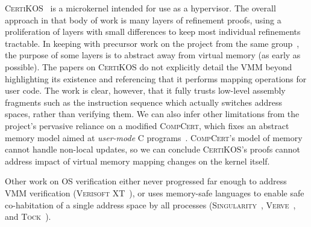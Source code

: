 \textsc{CertiKOS}~\cite{gu15,gu2016certikos,gu2018certikos,chen2016interrupts} is a microkernel intended for use as a hypervisor.
The overall approach in that body of work is many layers of refinement proofs, using a
 proliferation of layers with small differences to keep most individual refinements tractable. In keeping with precursor work 
on the project from the same group~\cite{vaynberg2012compositional}, the purpose of some layers is to abstract away from 
virtual memory (as early as possible).
The papers on \textsc{CertiKOS} do not explicitly detail the VMM beyond highlighting its existence and referencing
that it performs mapping operations for user code.
The work is clear, however, that it fully trusts low-level assembly fragments such as the instruction sequence which actually
switches address spaces, rather than verifying them.
We can also infer other limitations from the project's pervasive reliance on a modified \textsc{CompCert},
which fixes an abstract memory model aimed at \emph{user-mode} C programs~\cite{leroy2008formal,leroy2009formally}. 
\textsc{CompCert}'s model of memory cannot handle non-local updates, so we can conclude \textsc{CertiKOS}'s proofs cannot
address impact of virtual memory mapping changes on the kernel itself.


Other work on OS verification either never progressed far enough to address VMM verification 
(\textsc{Verisoft XT}~\cite{cohen2009vcc,cohen2010local,dahlweid2009vcc,cohen2013SOFSEM}), or uses memory-safe languages to enable safe co-habitation 
of a single address space by all processes (\textsc{Singularity}~\cite{Fahndrich2006language,Hunt2007singularity,Hunt2007sealing,Barnett2011specsharp}, \textsc{Verve}~\cite{Yang2010Verve},
and \textsc{Tock}~\cite{levy2017multiprogramming}).
 
